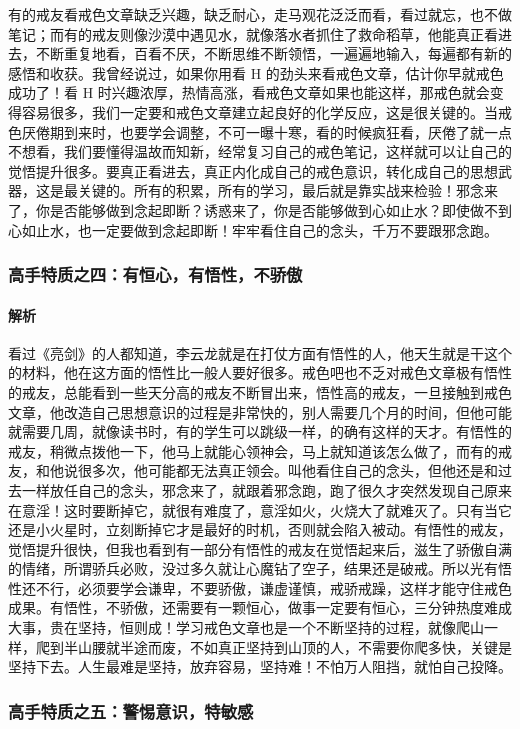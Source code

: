 有的戒友看戒色文章缺乏兴趣，缺乏耐心，走马观花泛泛而看，看过就忘，也不做笔记；而有的戒友则像沙漠中遇见水，就像落水者抓住了救命稻草，他能真正看进去，不断重复地看，百看不厌，不断思维不断领悟，一遍遍地输入，每遍都有新的感悟和收获。我曾经说过，如果你用看 H 的劲头来看戒色文章，估计你早就戒色成功了！看 H 时兴趣浓厚，热情高涨，看戒色文章如果也能这样，那戒色就会变得容易很多，我们一定要和戒色文章建立起良好的化学反应，这是很关键的。当戒色厌倦期到来时，也要学会调整，不可一曝十寒，看的时候疯狂看，厌倦了就一点不想看，我们要懂得温故而知新，经常复习自己的戒色笔记，这样就可以让自己的觉悟提升很多。要真正看进去，真正内化成自己的戒色意识，转化成自己的思想武器，这是最关键的。所有的积累，所有的学习，最后就是靠实战来检验！邪念来了，你是否能够做到念起即断？诱惑来了，你是否能够做到心如止水？即使做不到心如止水，也一定要做到念起即断！牢牢看住自己的念头，千万不要跟邪念跑。

\subsubsection{高手特质之四：有恒心，有悟性，不骄傲}

\paragraph{解析} 看过《亮剑》的人都知道，李云龙就是在打仗方面有悟性的人，他天生就是干这个的材料，他在这方面的悟性比一般人要好很多。戒色吧也不乏对戒色文章极有悟性的戒友，总能看到一些天分高的戒友不断冒出来，悟性高的戒友，一旦接触到戒色文章，他改造自己思想意识的过程是非常快的，别人需要几个月的时间，但他可能就需要几周，就像读书时，有的学生可以跳级一样，的确有这样的天才。有悟性的戒友，稍微点拨他一下，他马上就能心领神会，马上就知道该怎么做了，而有的戒友，和他说很多次，他可能都无法真正领会。叫他看住自己的念头，但他还是和过去一样放任自己的念头，邪念来了，就跟着邪念跑，跑了很久才突然发现自己原来在意淫！这时要断掉它，就很有难度了，意淫如火，火烧大了就难灭了。只有当它还是小火星时，立刻断掉它才是最好的时机，否则就会陷入被动。有悟性的戒友，觉悟提升很快，但我也看到有一部分有悟性的戒友在觉悟起来后，滋生了骄傲自满的情绪，所谓骄兵必败，没过多久就让心魔钻了空子，结果还是破戒。所以光有悟性还不行，必须要学会谦卑，不要骄傲，谦虚谨慎，戒骄戒躁，这样才能守住戒色成果。有悟性，不骄傲，还需要有一颗恒心，做事一定要有恒心，三分钟热度难成大事，贵在坚持，恒则成！学习戒色文章也是一个不断坚持的过程，就像爬山一样，爬到半山腰就半途而废，不如真正坚持到山顶的人，不需要你爬多快，关键是坚持下去。人生最难是坚持，放弃容易，坚持难！不怕万人阻挡，就怕自己投降。

\subsubsection{高手特质之五：警惕意识，特敏感}

